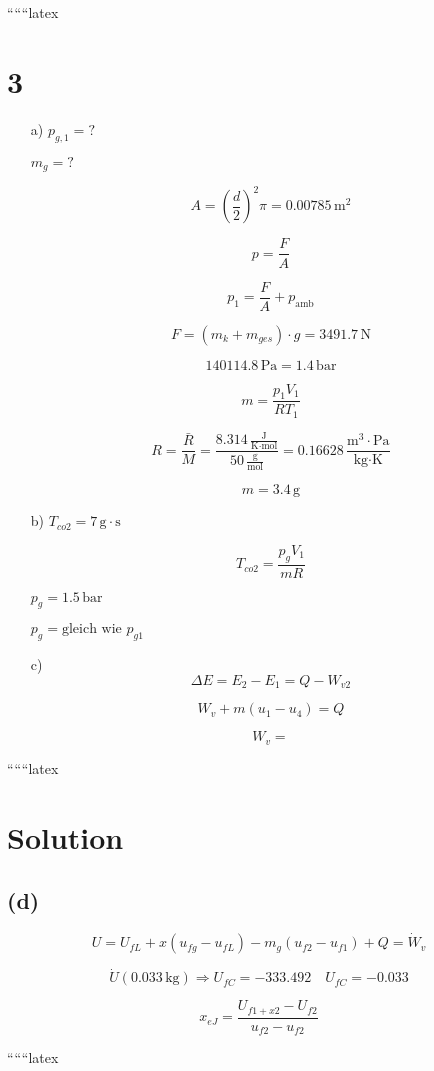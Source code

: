 
``````latex


\section*{3}

\begin{itemize}
    \item[a)] $p_{g,1} = ?$
    \item[] $m_g = ?$
    \item[] \[
    A = \left(\frac{d}{2}\right)^2 \pi = 0.00785 \, \text{m}^2
    \]
    \item[] \[
    p = \frac{F}{A}
    \]
    \item[] \[
    p_1 = \frac{F}{A} + p_{\text{amb}}
    \]
    \item[] \[
    F = (m_k + m_{ges}) \cdot g = 3491.7 \, \text{N}
    \]
    \item[] \[
    140114.8 \, \text{Pa} = 1.4 \, \text{bar}
    \]
    \item[] \[
    m = \frac{p_1 V_1}{R T_1}
    \]
    \item[] \[
    R = \frac{\bar{R}}{M} = \frac{8.314 \, \frac{\text{J}}{\text{K} \cdot \text{mol}}}{50 \, \frac{\text{g}}{\text{mol}}} = 0.16628 \, \frac{\text{m}^3 \cdot \text{Pa}}{\text{kg} \cdot \text{K}}
    \]
    \item[] \[
    m = 3.4 \, \text{g}
    \]
    \item[b)] $T_{co2} = 7 \, \text{g} \cdot \text{s}$
    \item[] \[
    T_{co2} = \frac{p_{g} V_1}{m R}
    \]
    \item[] $p_{g} = 1.5 \, \text{bar}$
    \item[] $p_{g} = \text{gleich wie } p_{g1}$
    \item[] 
    \item[c)] \[
    \Delta E = E_2 - E_1 = Q - W_{v2}
    \]
    \item[] \[
    W_v + m (u_1 - u_4) = Q
    \]
    \item[] \[
    W_v = 
    \]
\end{itemize}

``````latex


\section*{Solution}

\subsection*{(d)}

\[
U = U_{fL} + x \left( u_{fg} - u_{fL} \right) - m_g \left( u_{f2} - u_{f1} \right) + Q = \dot{W}_v
\]

\[
\dot{U} (0.033 \, \text{kg}) \Rightarrow U_{fC} = -333.492 \quad U_{fC} = -0.033
\]

\[
x_{eJ} = \frac{U_{f1+x2} - U_{f2}}{u_{f2} - u_{f2}}
\]

``````latex


